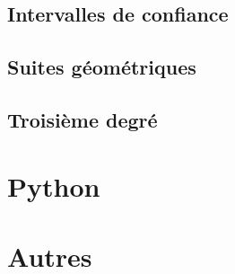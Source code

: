 \documentclass[a4paper,12pt]{book}
\begin{document}
\chapter{Intervalles de confiance}


\chapter{Suites géométriques}


\chapter{Troisième degré}


\part{Python}


\part{Autres}

%







\printnomenclature

\printindex
\end{document}
